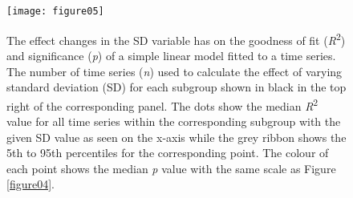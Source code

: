 \documentclass{ametsoc}
\begin{document}
\begin{figure}
\centering \texttt{[image: figure05]}
\caption[\small The effect changes in the SD variable has on the goodness of fit (\emph{R}\textsuperscript{2}) and significance (\emph{p}) of a simple linear model fitted to a time series]{The effect changes in the SD variable has on the goodness of fit (\emph{R}\textsuperscript{2}) and significance (\emph{p}) of a simple linear model fitted to a time series. The number of time series (\emph{n}) used to calculate the effect of varying standard deviation (SD) for each subgroup shown in black in the top right of the corresponding panel. The dots show the median \emph{R}\textsuperscript{2} value for all time series within the corresponding subgroup with the given SD value as seen on the x-axis while the grey ribbon shows the 5th to 95th percentiles for the corresponding point. The colour of each point shows the median \emph{p} value with the same scale as Figure \ref{figure04}.}
\label{figure05}
\end{figure}
\end{document}
